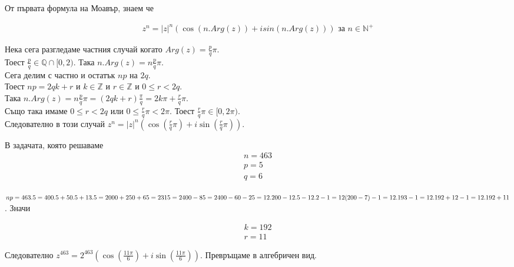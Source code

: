 \documentclass{article}[12pt]
\begin{document}
\vspace{0.5cm}

От първата формула на Моавър, знаем че

\begin{align*}
z^n = |z|^n(\cos(n.Arg(z)) + i sin(n.Arg(z))) \text{ за \(n \in \mathbb{N}^+\)}
\end{align*}

Нека сега разгледаме частния случай когато \(Arg(z) = \displaystyle{\frac{p}{q}}\pi\). \\
Тоест \(\displaystyle{\frac{p}{q}} \in \mathbb{Q} \cap [0, 2)\). Така \(n.Arg(z) = n\displaystyle{\frac{p}{q}}\pi \). \\
Сега делим с частно и остатък \(np\) на \(2q\). \\
Тоест \(np = 2qk + r\) и \(k \in \mathbb{Z}\) и \(r \in \mathbb{Z}\) и \(0 \leq r < 2q\). \\
Така \(n.Arg(z) = n\displaystyle{\frac{p}{q}}\pi = (2qk + r)\displaystyle{\frac{\pi}{q}} = 2k\pi + \displaystyle{\frac{r}{q}}\pi\). \\
Също така имаме \(0 \leq r < 2q\) или \(0 \leq \displaystyle{\frac{r}{q}}\pi < 2\pi\). Тоест \(\displaystyle{\frac{r}{q}}\pi \in [0, 2\pi) \). \\
Следователно в този случай \(z^n = |z|^n\left(\cos\left(\displaystyle{\frac{r}{q}}\pi\right) + i \sin\left(\displaystyle{\frac{r}{q}}\pi\right)\right)\).

\vspace{0.5cm}

В задачата, която решаваме
\begin{align*}
n = 463 \\
p = 5 \\
q = 6
\end{align*}

\(np =  463.5 = 400.5 + 50.5 + 13.5 = 2000 + 250 + 65 = 2315 = \\
2400 - 85 = 2400 - 60 - 25 = 12.200 - 12.5 - 12.2 - 1 = 12(200 - 7) - 1 = \\
12.193 - 1 = 12.192 + 12 - 1 = 12.192 + 11\). Значи 

\begin{align*}
k = 192 \\
r = 11
\end{align*}

Следователно \(z^{463} = 2^{463}\left(\cos\left(\displaystyle{\frac{11\pi}{6}}\right) + i\sin\left(\displaystyle{\frac{11\pi}{6}}\right)\right)\).
Превръщаме в алгебричен вид.

\vspace{0.5cm}
\end{document}

